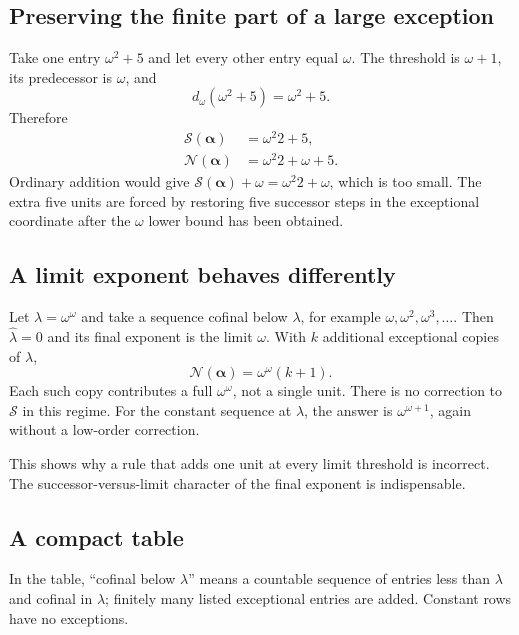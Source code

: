 \documentclass[11pt,letterpaper]{article}
\theoremstyle{definition}
\theoremstyle{remark}
\newcommand{\Nop}{\mathcal N}
\newcommand{\Sop}{\mathcal S}
\newcommand{\seq}[1]{\boldsymbol{#1}}
\newcommand{\diff}[2]{d_{#1}(#2)}
\begin{document}
\subsection{Preserving the finite part of a large exception}

Take one entry $\omega^2+5$ and let every other entry equal $\omega$. The threshold is $\omega+1$, its predecessor is $\omega$, and
\[
 \diff\omega{\omega^2+5}=\omega^2+5.
\]
Therefore
\begin{align*}
 \Sop(\seq\alpha)&=\omega^2 2+5,\\
 \Nop(\seq\alpha)&=\omega^2 2+\omega+5.
\end{align*}
Ordinary addition would give $\Sop(\seq\alpha)+\omega=\omega^2 2+\omega$, which is too small. The extra five units are forced by restoring five successor steps in the exceptional coordinate after the $\omega$ lower bound has been obtained.

\subsection{A limit exponent behaves differently}

Let $\lambda=\omega^\omega$ and take a sequence cofinal below $\lambda$, for example $\omega,\omega^2,\omega^3,\ldots$. Then $\widehat\lambda=0$ and its final exponent is the limit $\omega$. With $k$ additional exceptional copies of $\lambda$,
\begin{equation}\label{eq:limit-exponent}
 \Nop(\seq\alpha)=\omega^\omega(k+1).
\end{equation}
Each such copy contributes a full $\omega^\omega$, not a single unit. There is no correction to $\Sop$ in this regime. For the constant sequence at $\lambda$, the answer is $\omega^{\omega+1}$, again without a low-order correction.

This shows why a rule that adds one unit at every limit threshold is incorrect. The successor-versus-limit character of the final exponent is indispensable.

\subsection{A compact table}

In the table, ``cofinal below $\lambda$'' means a countable sequence of entries less than $\lambda$ and cofinal in $\lambda$; finitely many listed exceptional entries are added. Constant rows have no exceptions.
\end{document}
